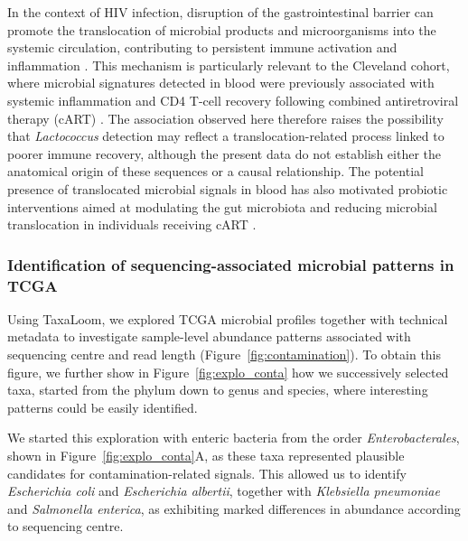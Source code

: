 \documentclass[pdflatex,sn-vancouver-num]{sn-jnl}%
\theoremstyle{thmstyleone}%
\theoremstyle{thmstyletwo}%
\theoremstyle{thmstylethree}%
\begin{document}
In the context of HIV infection, disruption of the gastrointestinal barrier can promote the translocation of microbial products and microorganisms into the systemic circulation, contributing to persistent immune activation and inflammation \citep{brenchley_microbial_2012,sandler_microbial_2012}. This mechanism is particularly relevant to the Cleveland cohort, where microbial signatures detected in blood were previously associated with systemic inflammation and CD4 T-cell recovery following combined antiretroviral therapy (cART) \citep{nganou-makamdop_translocated_2021}. The association observed here therefore raises the possibility that \textit{Lactococcus} detection may reflect a translocation-related process linked to poorer immune recovery, although the present data do not establish either the anatomical origin of these sequences or a causal relationship. The potential presence of translocated microbial signals in blood has also motivated probiotic interventions aimed at modulating the gut microbiota and reducing microbial translocation in individuals receiving cART \citep{dettorre_probiotics_2015}.


\subsubsection{Identification of sequencing-associated microbial patterns in TCGA}

Using TaxaLoom, we explored TCGA microbial profiles together with technical metadata to investigate sample-level abundance patterns associated with sequencing centre and read length (Figure~\ref{fig:contamination}). To obtain this figure, we further show in Figure~\ref{fig:explo_conta} how we successively selected taxa, started from the phylum down to genus and species, where interesting patterns could be easily identified. 

We started this exploration with enteric bacteria from the order \textit{Enterobacterales}, shown in Figure~\ref{fig:explo_conta}A, as these taxa represented plausible candidates for contamination-related signals. This allowed us to identify \textit{Escherichia coli} and \textit{Escherichia albertii}, together with \textit{Klebsiella pneumoniae} and \textit{Salmonella enterica}, as exhibiting marked differences in abundance according to sequencing centre.
\end{document}
